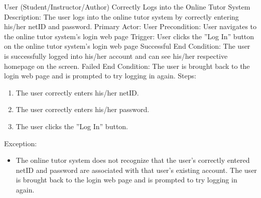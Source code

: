     \begin{section}{User (Student/Instructor/Author) Correctly Logs into the Online Tutor System}
        Description: The user logs into the online tutor system by correctly entering his/her netID and password. \newline
        Primary Actor: User \newline
        Precondition: User navigates to the online tutor system's login web page \newline
        Trigger: User clicks the ''Log In'' button on the online tutor system's login web page \newline
        Successful End Condition: The user is successfully logged into his/her account and can see his/her respective homepage on the screen. \newline
        Failed End Condition: The user is brought back to the login web page and is prompted to try logging in again. \newline
        \newline
        Steps:
        \begin{enumerate}
            \item{The user correctly enters his/her netID.}
            \item{The user correctly enters his/her password.}
            \item{The user clicks the ''Log In'' button.}
        \end{enumerate}
        Exception:
        \begin{itemize}
            \item{The online tutor system does not recognize that the user's correctly entered netID and password are associated with that user's existing account.
            The user is brought back to the login web page and is prompted to try logging in again.}
        \end{itemize}
    \end{section}
    

